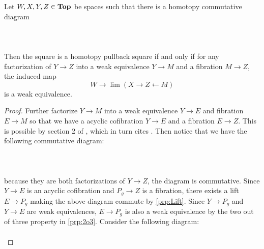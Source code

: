 \begin{prp}\label{prp:AnyFac} Let $W,X,Y,Z\in\bold{Top}$ be spaces such that there is a homotopy commutative diagram  
 \\~\\  \\~\\
Then the square is a homotopy pullback square if and only if for any factorization of $Y\to Z$ into a weak equivalence $Y\to M$ and a fibration $M\to Z$, the induced map $$W\to\lim(X\rightarrow Z\leftarrow M)$$ is a weak equivalence. 
\begin{proof}
Further factorize $Y\to M$ into a weak equivalence $Y\to E$ and fibration $E\to M$ so that we have a acyclic cofibration $Y\to E$ and a fibration $E\to Z$. This is possible by section 2 of \cite{TBER}, which in turn cites \cite{NC}. Then notice that we have the following commutative diagram:  
 \\~\\  \\~\\
because they are both factorizations of $Y\to Z$, the diagram is commutative. Since $Y\to E$ is an acyclic cofibration and $P_g\to Z$ is a fibration, there exists a lift $E\to P_g$ making the above diagram commute by \ref{prp:Lift}. Since $Y\to P_g$ and $Y\to E$ are weak equivalences, $E\to P_g$ is also a weak equivalence by the two out of three property in \ref{prp:2o3}. Consider the following diagram: 
 \\~\\ 
\end{proof}
\end{prp}
